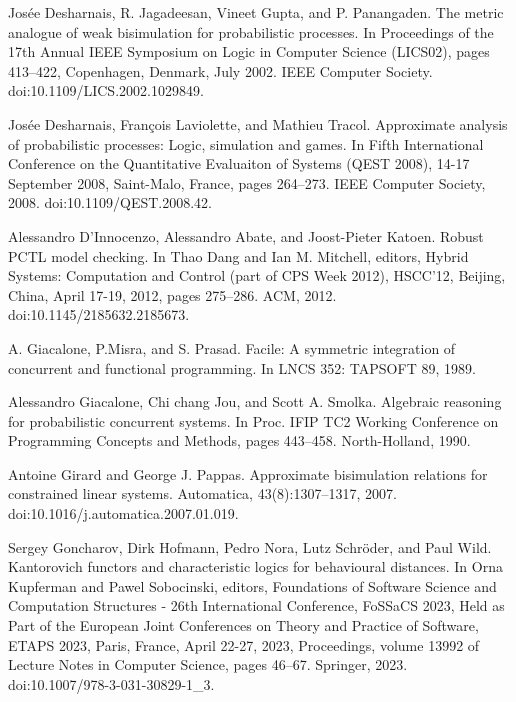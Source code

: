 \par\noindent  [25]  Josée Desharnais, R. Jagadeesan, Vineet Gupta, and P. Panangaden.  The metric analogue of weak bisimulation for probabilistic processes.  In Proceedings of the 17th Annual IEEE Symposium on Logic in Computer Science (LICS02), pages 413–422, Copenhagen, Denmark, July 2002. IEEE Computer Society.  doi:10.1109/LICS.2002.1029849.  
 
\par\noindent  [26]  Josée Desharnais, François Laviolette, and Mathieu Tracol.  Approximate analysis of probabilistic processes: Logic, simulation and games.  In Fifth International Conference on the Quantitative Evaluaiton of Systems (QEST 2008), 14-17 September 2008, Saint-Malo, France, pages 264–273. IEEE Computer Society, 2008.  doi:10.1109/QEST.2008.42.  
 
\par\noindent  [27]  Alessandro D’Innocenzo, Alessandro Abate, and Joost-Pieter Katoen.  Robust PCTL model checking.  In Thao Dang and Ian M. Mitchell, editors, Hybrid Systems: Computation and Control (part of CPS Week 2012), HSCC’12, Beijing, China, April 17-19, 2012, pages 275–286. ACM, 2012.  doi:10.1145/2185632.2185673.  
 
\par\noindent  [28]  A. Giacalone, P.Misra, and S. Prasad.  Facile: A symmetric integration of concurrent and functional programming.  In LNCS 352: TAPSOFT 89, 1989.  
 
\par\noindent  [29]  Alessandro Giacalone, Chi chang Jou, and Scott A. Smolka.  Algebraic reasoning for probabilistic concurrent systems.  In Proc. IFIP TC2 Working Conference on Programming Concepts and Methods, pages 443–458. North-Holland, 1990.  
 
\par\noindent  [30]  Antoine Girard and George J. Pappas.  Approximate bisimulation relations for constrained linear systems.  Automatica, 43(8):1307–1317, 2007.  doi:10.1016/j.automatica.2007.01.019.  
 
\par\noindent  [31]  Sergey Goncharov, Dirk Hofmann, Pedro Nora, Lutz Schröder, and Paul Wild.  Kantorovich functors and characteristic logics for behavioural distances.  In Orna Kupferman and Pawel Sobocinski, editors, Foundations of Software Science and Computation Structures - 26th International Conference, FoSSaCS 2023, Held as Part of the European Joint Conferences on Theory and Practice of Software, ETAPS 2023, Paris, France, April 22-27, 2023, Proceedings, volume 13992 of Lecture Notes in Computer Science, pages 46–67. Springer, 2023.  doi:10.1007/978-3-031-30829-1\_3.  
 
